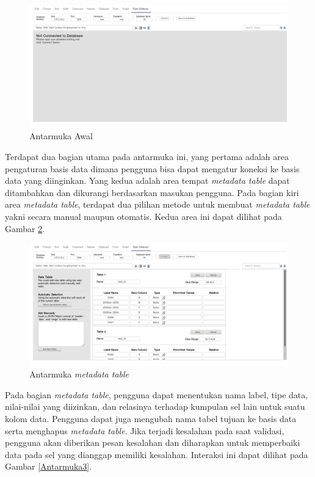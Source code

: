 \begin{figure}[htb]
	\centering
	\includegraphics[width=1.0\textwidth]{resources/chapter-4-interface-1.png}
	\caption{Antarmuka Awal}
	\label{Antarmuka1}
\end{figure}

Terdapat dua bagian utama pada antarmuka ini, yang pertama adalah area pengaturan basis data dimana pengguna bisa dapat mengatur koneksi ke basis data yang diinginkan. Yang kedua adalah area tempat \textit{metadata table} dapat ditambahkan dan dikurangi berdasarkan masukan pengguna. Pada bagian kiri area \textit{metadata table}, terdapat dua pilihan metode untuk membuat \textit{metadata table} yakni secara manual maupun otomatis. Kedua area ini dapat dilihat pada Gambar \ref{Antarmuka2}.

\begin{figure}[htbp]
	\centering
	\includegraphics[width=1.0\textwidth]{resources/chapter-4-interface-2.png}
	\caption{Antarmuka \textit{metadata table}}
	\label{Antarmuka2}
\end{figure}

Pada bagian \textit{metadata table}, pengguna dapat menentukan nama label, tipe data, nilai-nilai yang diizinkan, dan relasinya terhadap kumpulan sel lain untuk suatu kolom data. Pengguna dapat juga mengubah nama tabel tujuan ke basis data serta menghapus \textit{metadata table}. Jika terjadi kesalahan pada saat validasi, pengguna akan diberikan pesan kesalahan dan diharapkan untuk memperbaiki data pada sel yang dianggap memiliki kesalahan. Interaksi ini dapat dilihat pada Gambar \ref{Antarmuka3}.

